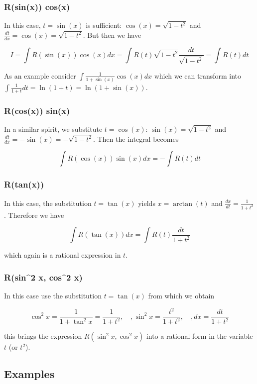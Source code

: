 \subsubsection{R(sin(x)) cos(x)}

In this case, \(t=\sin(x)\) is sufficient: \(\cos(x) = \sqrt{1-t^2}\)
and \(\frac{dt}{dx}=\cos(x) = \sqrt{1-t^2}\). But then we have

\[
I = \int R(\sin(x)) \cos(x) dx = \int R(t) \sqrt{1-t^2} \frac{dt}{\sqrt{1-t^2}}  = \int R(t) dt
\]

As an example consider \(\int \frac{1}{1+\sin(x)} \cos(x) dx\) which we
can transform into \(\int \frac{1}{1+t}dt = \ln(1+t) = \ln(1+\sin(x))\).

\subsubsection{R(cos(x)) sin(x)}

In a similar spirit, we substitute \(t=\cos(x)\):
\(\sin(x) = \sqrt{1 - t^2}\) and
\(\frac{dt}{dx} = -\sin(x) = -\sqrt{1-t^2}\). Then the integral becomes

\[
\int R(\cos(x)) \sin(x) dx = - \int R(t) dt
\]

\subsubsection{R(tan(x))}

In this case, the substitution \(t=\tan(x)\) yields \(x=\arctan(t)\) and
\(\frac{dx}{dt} = \frac{1}{1+t^2}\). Therefore we have

\[
\int R(\tan(x))dx = \int R(t) \frac{dt}{1+t^2}
\]

which again is a rational expression in \(t\).

\subsubsection{R(sin\^{}2 x, cos\^{}2 x)}

In this case use the substitution \(t=\tan(x)\) from which we obtain

\[
\cos^2 x = \frac{1}{1+\tan^2 x} = \frac{1}{1+t^2}, \quad, \sin^2 x = \frac{t^2}{1+t^2}, \quad, dx = \frac{dt}{1+t^2}
\]

this brings the expression \(R(\sin^2 x, \cos^2 x)\) into a rational
form in the variable \(t\) (or \(t^2\)).

\subsection{Examples}

